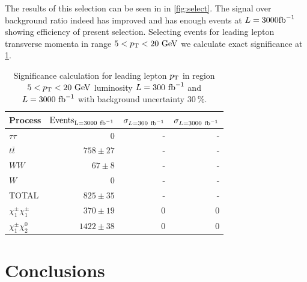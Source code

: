 \documentclass[tightenline,notitlepage,nofootinbib]{revtex4-1}
\begin{document}
The results of this selection can be seen in in \cref{fig:select}. The signal over background ratio indeed has improved and has enough events at $L=3000 \rm{fb}^{-1}$ showing efficiency of present selection. Selecting events for leading lepton transverse momenta in range $5<p_{\rm T}<20~\rm{GeV}$ we calculate exact significance at \cref{tab:select}.
\begin{table}[!ht]
  \setlength{\tabcolsep}{12pt}
  \centering
  \begin{tabular}{l|rrr}
    Process & $\rm{Events}_{L=3000~\rm{fb}^{-1}}$ &$\sigma_{L=300~\rm{fb}^{-1}}$ & $\sigma_{L=3000~\rm{fb}^{-1}}$ \\
    \hline
    $\tau \tau$ & 0 & - & - \\
    $t \bar t$ & $758 \pm 27$ & - & - \\
    $WW$ & $67\pm8$ & - & - \\
    $W$ & 0 & - & - \\
    \hline
    TOTAL & $825 \pm 35$ & - & - \\
    \hline
    $\chi_1^{\pm} \chi_1^{\pm}$ & $370 \pm 19$ & 0 & 0 \\
    $\chi_1^{\pm} \chi_2^0$ & $1422 \pm 38$ & 0 & 0 
  \end{tabular}
  \caption{Significance calculation for leading lepton $p_{\rm T}$ in region $5<p_{\rm T}<20~\rm{GeV}$ luminosity $L=300~\rm{fb}^{-1}$ and $L=3000~\rm{fb}^{-1}$ with background uncertainty $30~\%$.
  }
  \label{tab:select}
\end{table}

\section{Conclusions}
\end{document}
